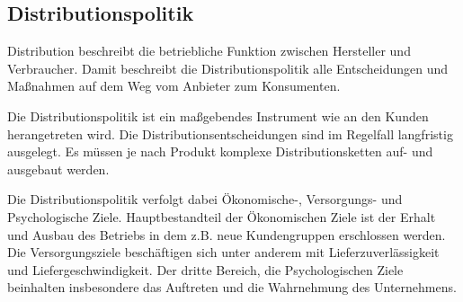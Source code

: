 \subsection{Distributionspolitik} \label{distro}
    Distribution beschreibt die betriebliche Funktion zwischen Hersteller und Verbraucher. Damit beschreibt die
    Distributionspolitik alle Entscheidungen und Maßnahmen auf dem Weg vom Anbieter zum Konsumenten.

    \noindent
    Die Distributionspolitik ist ein maßgebendes Instrument wie an den Kunden herangetreten wird. Die
    Distributionsentscheidungen sind im Regelfall langfristig ausgelegt. Es müssen je nach Produkt komplexe
    Distributionsketten auf- und ausgebaut werden.

    \noindent
    Die Distributionspolitik verfolgt dabei Ökonomische-, Versorgungs- und Psychologische Ziele. Hauptbestandteil der
    Ökonomischen Ziele ist der Erhalt und Ausbau des Betriebs in dem z.B. neue Kundengruppen erschlossen werden. Die
    Versorgungsziele beschäftigen sich unter anderem mit Lieferzuverlässigkeit und Liefergeschwindigkeit. Der dritte
    Bereich, die Psychologischen Ziele beinhalten insbesondere das Auftreten und die Wahrnehmung des Unternehmens.
    